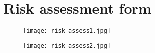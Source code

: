 
\chapter{Risk assessment form}
\label{appendixf}

\begin{figure}[htbp]
\centerline{\texttt{[image: risk-assess1.jpg]}}
\label{riskform1}
\end{figure}

\newpage

\begin{figure}[htbp]
\centerline{\texttt{[image: risk-assess2.jpg]}}
\label{riskform2}
\end{figure}